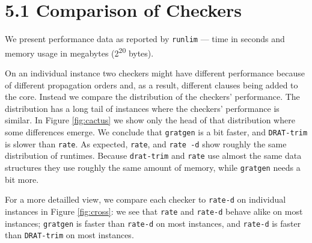 \documentclass[
]{report}
\begin{document}
\hypertarget{comparison-of-checkers}{%
\section{5.1 Comparison of Checkers}\label{comparison-of-checkers}}

We present performance data as reported by \texttt{runlim} --- time in
seconds and memory usage in megabytes (2\textsuperscript{20} bytes).

On an individual instance two checkers might have different performance
because of different propagation orders and, as a result, different
clauses being added to the core. Instead we compare the distribution of
the checkers' performance. The distribution has a long tail of instances
where the checkers' performance is similar. In Figure \ref{fig:cactus}
we show only the head of that distribution where some differences
emerge. We conclude that \texttt{gratgen} is a bit faster, and
\texttt{DRAT-trim} is slower than \texttt{rate}. As expected,
\texttt{rate}, and \texttt{rate\ -d} show roughly the same distribution
of runtimes. Because \texttt{drat-trim} and \texttt{rate} use almost the
same data structures they use roughly the same amount of memory, while
\texttt{gratgen} needs a bit more.

For a more detailled view, we compare each checker to \texttt{rate-d} on
individual instances in Figure \ref{fig:cross}: we see that
\texttt{rate} and \texttt{rate-d} behave alike on most instances;
\texttt{gratgen} is faster than \texttt{rate-d} on most instances, and
\texttt{rate-d} is faster than \texttt{DRAT-trim} on most instances.
\end{document}
